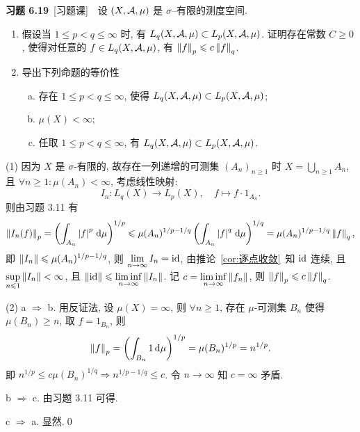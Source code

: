     \textbf{习题 6.19}\ [习题课]\ \ 设 $ (X, \mathcal{A}, \mu) $ 是 $ \sigma $--有限的测度空间.
    \begin{enumerate}[(1)]
        \item 假设当 $ 1\leqslant p<q\leqslant\infty $ 时, 有 $ L_{q}(X, \mathcal{A}, \mu)\subset L_{p}(X, \mathcal{A}, \mu) $. 证明存在常数 $ C\geqslant0 $, 使得对任意的 $ f\in L_{q}(X, \mathcal{A}, \mu) $, 有 $ \left\| f \right\|_{p}\leqslant c\left\| f \right\|_{q} $.
        \item 导出下列命题的等价性
        \begin{enumerate}[a. ]
            \item 存在 $ 1\leqslant p<q\leqslant\infty $, 使得 $ L_{q}(X, \mathcal{A}, \mu)\subset L_{p}(X, \mathcal{A}, \mu) $;
            \item $ \mu(X)<\infty $;
            \item 任取 $ 1\leqslant p<q\leqslant\infty $, 有 $ L_{q}(X, \mathcal{A}, \mu)\subset L_{p}(X, \mathcal{A}, \mu) $.
        \end{enumerate}
    \end{enumerate}
    \begin{Proof}
        (1) 因为 $ X $ 是 $ \sigma $-有限的, 故存在一列递增的可测集 $ (A_{n})_{n\geqslant1} $ 时 $ X=\bigcup_{n\geqslant1}A_{n} $, 且 $ \forall n\geqslant1:\mu(A_{n})<\infty $, 考虑线性映射:
        \[
            I_{n}: L_{q}(X)\to L_{p}(X), \quad f\mapsto f\cdot 1_{A_{n}}.
        \] 
        则由习题 3.11 有
        \[
            \left\| I_{n}(f) \right\|_{p}=\left( \int_{A_{n}}\left| f \right| ^{p}\,\mathrm{d}\mu \right)^{1/p}\leqslant \mu(A_{n})^{1/p-1/q}\left( \int_{A_{n}}\left| f \right| ^{q}\,\mathrm{d}\mu \right)^{1/q}=\mu(A_{n})^{1/p-1/q}\left\| f \right\|_{q},
        \]
        即 $ \left\| I_{n} \right\|\leqslant\mu(A_{n})^{1/p-1/q} $, 则 $ \lim\limits_{n\to\infty}I_{n}=\mathrm{id} $, 由推论~\ref{cor:逐点收敛}~知 $ \mathrm{id} $ 连续, 且 $ \sup\limits_{n\leqslant1}\left\| I_{n} \right\|<\infty $, 且 $ \left\| \mathrm{id} \right\|\leqslant\liminf\limits_{n\to\infty}\left\| I_{n} \right\| $. 记 $ c=\liminf\limits_{n\to\infty}\left\| f_{n} \right\| $, 则 $ \left\| f \right\|_{p}\leqslant c\left\| f \right\|_{q} $.
        
        (2) a $ \Rightarrow $ b. 用反证法, 设 $ \mu(X)=\infty $, 则 $ \forall n\geqslant1 $, 存在 $ \mu $-可测集 $ B_{n} $ 使得 $ \mu(B_{n})\geqslant n $, 取 $ f = 1_{B_{n}} $, 则
        \[
            \left\| f \right\|_{p}=\left( \int_{B_{n}}1\,\mathrm{d}\mu \right)^{1/p}=\mu(B_{n})^{1/p}=n^{1/p}.
        \]
        即 $ n^{1/p}\leqslant c\mu(B_{n})^{1/q}\Longrightarrow n^{1/p-1/q}\leqslant c $. 令 $ n\to \infty $ 知 $ c=\infty $ 矛盾.

        b $ \Rightarrow $ c. 由习题 3.11 可得.

        c $ \Rightarrow $ a. 显然.\qed
    \end{Proof}

